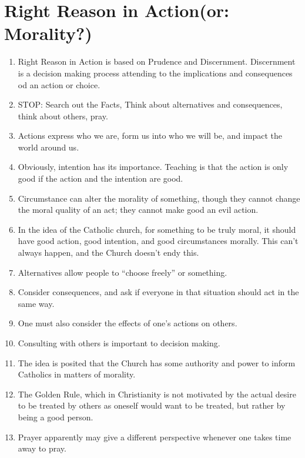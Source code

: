 \documentclass[10pt]{article}
\begin{document}
\section{Right Reason in Action(or: Morality?)}
\begin{enumerate}
  \item Right Reason in Action is based on Prudence and Discernment.  
	  Discernment is a decision making process attending to the implications
	  and consequences od an action or choice.
  \item STOP: Search out the Facts, Think about alternatives and consequences, 
	  think about others, pray.
  \item Actions express who we are, form us into who we will be, and impact 
	  the world around us.
  \item Obviously, intention has its importance.  Teaching is that the action 
	  is only good if the action and the intention are good.
  \item Circumstance can alter the morality of something, though they cannot 
	  change the moral quality of an act; they cannot make good an evil action.  
  \item In the idea of the Catholic church, for something to be truly moral, 
	  it should have good action, good intention, and good circumstances 
	  morally.  This can't always happen, and the Church doesn't endy this.  
  \item Alternatives allow people to ``choose freely'' or something.
  \item Consider consequences, and ask if everyone in that situation should 
	  act in the same way.
  \item One must also consider the effects of one's actions on others.
  \item Consulting with others is important to decision making.  
  \item The idea is posited that the Church has some authority and power to 
	  inform Catholics in matters of morality.
  \item The Golden Rule, which in Christianity is not motivated by the actual 
	  desire to be treated by others as oneself would want to be treated, but 
	  rather by being a good person.
  \item Prayer apparently may give a different perspective whenever one takes 
	  time away to pray.
\end{enumerate}
\end{document}
